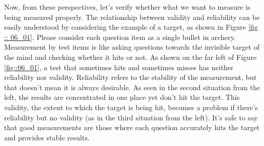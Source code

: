 \documentclass{ltjbook}
\begin{document}
Now, from these perspectives, let's verify whether what we want to measure is being measured properly. The relationship between validity and reliability can be easily understood by considering the example of a target, as shown in Figure \ref{fig :: 06_01}.
Please consider each question item as a single bullet in archery. Measurement by test items is like asking questions towards the invisible target of the mind and checking whether it hits or not.
As shown on the far left of Figure \ref{fig::06_01}, a test that sometimes hits and sometimes misses has neither reliability nor validity.
Reliability refers to the stability of the measurement, but that doesn't mean it is always desirable. As seen in the second situation from the left, the results are concentrated in one place yet don't hit the target. This validity, the extent to which the target is being hit, becomes a problem if there's reliability but no validity (as in the third situation from the left). It's safe to say that good measurements are those where each question accurately hits the target and provides stable results.


\end{document}
